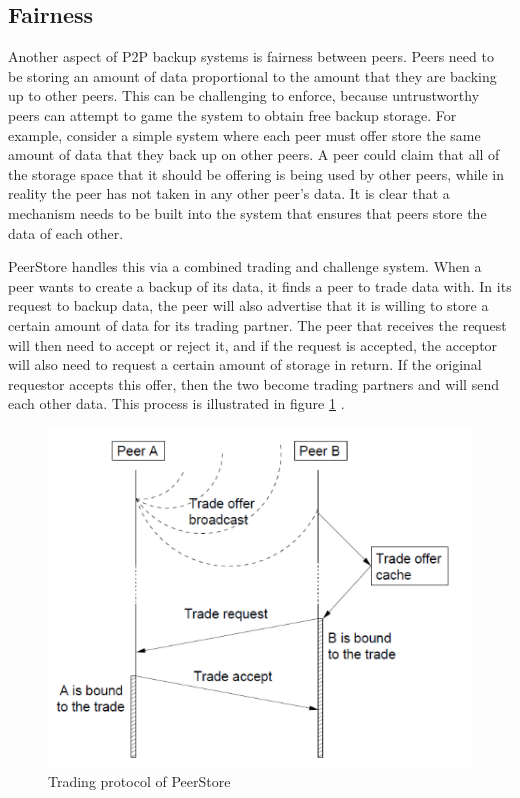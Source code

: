 \documentclass[12pt]{report}
\begin{document}
\subsection{Fairness}
Another aspect of P2P backup systems is fairness between peers. Peers need to be storing an amount of data proportional to the amount that they are backing up to other peers. This can be challenging to enforce, because untrustworthy peers can attempt to game the system to obtain free backup storage. For example, consider a simple system where each peer must offer store the same amount of data that they back up on other peers. A peer could claim that all of the storage space that it should be offering is being used by other peers, while in reality the peer has not taken in any other peer's data. It is clear that a mechanism needs to be built into the system that ensures that peers store the data of each other.

PeerStore handles this via a combined trading and challenge system. When a peer wants to create a backup of its data, it finds a peer to trade data with. In its request to backup data, the peer will also advertise that it is willing to store a certain amount of data for its trading partner. The peer that receives the request will then need to accept or reject it, and if the request is accepted, the acceptor will also need to request a certain amount of storage in return. If the original requestor accepts this offer, then the two become trading partners and will send each other data. This process is illustrated in figure \ref{fig:peerStoreTrading} \cite{PeerStore}.

\begin{figure} \label{fig:peerStoreTrading}
  \centering
  \includegraphics[scale=0.75]{PeerStoreTrading}
  \caption{Trading protocol of PeerStore}
\end{figure}
\end{document}
